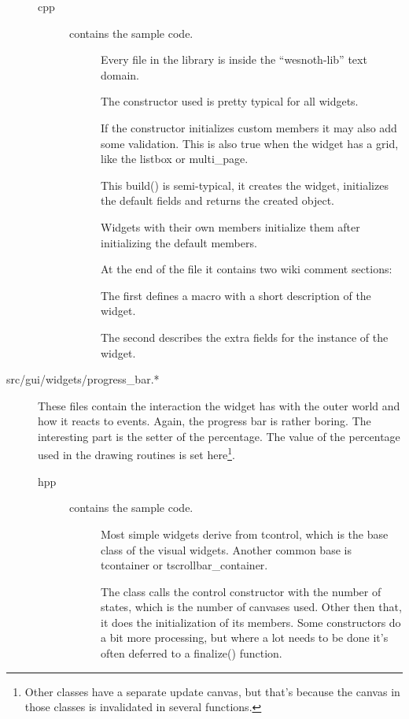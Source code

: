 \begin{description}
\begin{description}
\item[cpp]  contains the sample code. 
	\begin{description}
	\item[] Every file in the library
		is inside the ``wesnoth-lib'' text domain.
	\item[] The constructor used is
		pretty typical for all widgets.

		If the constructor initializes custom members it may also add some validation.
		This is also true when the widget has a grid, like the listbox or
		multi\_page.
	\item[]
		This build() is semi-typical, it creates the widget, initializes the
		default fields and returns the created object.

		Widgets with their own members initialize them after initializing the
		default members.
	\item[]
		At the end of the file it contains two wiki comment sections:

		The first defines a macro with a short description of the widget.

		The second describes the extra fields for the instance of the widget.
	\end{description}
\end{description}

\item[src/gui/widgets/progress\_bar.*]
	These files contain the interaction the widget has with the outer world and
	how it reacts to events. Again, the progress bar is rather boring. The
	interesting part is the setter of the percentage. The value of the
	percentage used in the drawing routines is set here\footnote{Other classes have a
	separate update canvas, but that's because the canvas in those classes is
	invalidated in several functions.}.

\begin{description}
\item[hpp]  contains the sample code. 
	\begin{description}
	\item[]
		Most simple widgets derive from tcontrol, which is the base class of the
		visual widgets. Another common base is tcontainer or
		tscrollbar\_container.

	\item[]
		The class calls the control constructor with the number of states, which
		is the number of canvases used. Other then that, it does the
		initialization of its members. Some constructors do a bit more
		processing, but where a lot needs to be done it's often deferred to a
		finalize() function.	


\end{description}
\end{description}
\end{description}
